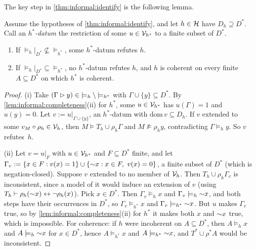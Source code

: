 The key step in \cref{thm:informal:identify} is the following lemma.

\begin{lemma}\label{lem:app:informal:bracket}
Assume the hypotheses of \cref{thm:informal:identify}, and let $h\in\mathcal{H}$ have $D_h\supseteq D^*$. Call an \emph{$h^*$-datum} the restriction of some $u\in\mathcal V_{h^*}$ to a finite subset of $D^*$.
\begin{enumerate}[label=(\roman*)]
\item If ${\models_h}|_{D^*}\not\subseteq{\models_{h^*}}$, some $h^*$-datum refutes $h$.
\item If ${\models_h}|_{D^*}\subseteq{\models_{h^*}}$, no $h^*$-datum refutes $h$, and $h$ is coherent on every finite $A\subseteq D^*$ on which $h^*$ is coherent.
\end{enumerate}
\end{lemma}

\begin{proof}
(i) Take $(\Gamma\rhd y)\in{\models_h}\setminus{\models_{h^*}}$ with $\Gamma\cup\{y\}\subseteq D^*$. By \cref{lem:informal:completeness}(ii) for $h^*$, some $u\in\mathcal V_{h^*}$ has $u(\Gamma)=1$ and $u(y)=0$. Let $v:=u|_{\Gamma\cup\{y\}}$, an $h^*$-datum with $\mathrm{dom}\,v\subseteq D_h$. If $v$ extended to some $v_M\circ\rho_h\in\mathcal V_{h}$, then $M\models T_h\cup\rho_h\Gamma$ and $M\not\models\rho_hy$, contradicting $\Gamma\models_hy$. So $v$ refutes~$h$.

(ii) Let $v=u|_F$ with $u\in\mathcal V_{h^*}$ and $F\subseteq D^*$ finite, and let $\Gamma_v:=\{x\in F:v(x)=1\}\cup\{{\sim} x:x\in F,\ v(x)=0\}$, a finite subset of $D^*$ (which is negation-closed). Suppose $v$ extended to no member of $\mathcal V_{h}$. Then $T_h\cup\rho_h\Gamma_v$ is inconsistent, since a model of it would induce an extension of $v$ (using $T_h\vdash\rho_h({\sim} x)\leftrightarrow\neg\rho_h(x)$). Pick $x\in D^*$. Then $\Gamma_v\models_hx$ and $\Gamma_v\models_h{\sim} x$, and both steps have their occurrences in $D^*$, so $\Gamma_v\models_{h^*}x$ and $\Gamma_v\models_{h^*}{\sim} x$. But $u$ makes $\Gamma_v$ true, so by \cref{lem:informal:completeness}(ii) for $h^*$ it makes both $x$ and ${\sim} x$ true, which is impossible. For coherence: if $h$ were incoherent on $A\subseteq D^*$, then $A\models_hx$ and $A\models_h{\sim} x$ for $x\in D^*$, hence $A\models_{h^*}x$ and $A\models_{h^*}{\sim} x$, and $T^*\cup\rho^*A$ would be inconsistent.
\end{proof}

